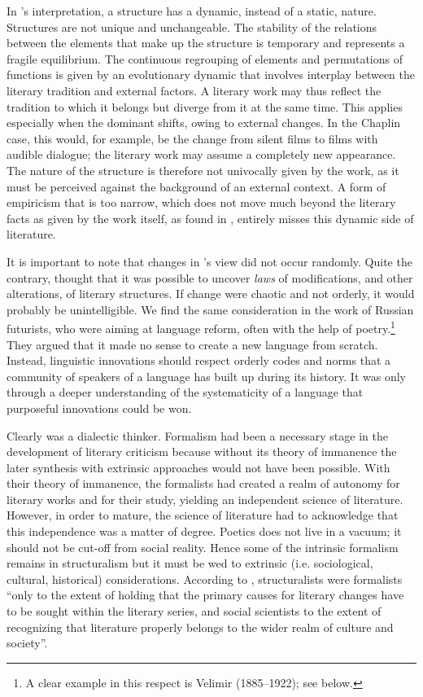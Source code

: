 \documentclass[output=paper]{langscibook}
\begin{document}
In {\Mukarovsky}'s interpretation, a structure has a dynamic, instead of a static, nature. Structures are not unique and unchangeable. The stability of the relations between the elements that make up the structure is temporary and represents a fragile equilibrium. The continuous regrouping of elements and permutations of functions is given by an evolutionary dynamic that involves interplay between the literary tradition and external factors. A literary work may thus reflect the tradition to which it belongs but diverge from it at the same time. This applies especially when the dominant shifts, owing to external changes. In the Chaplin case, this would, for example, be the change from silent films to films with audible dialogue; the literary work may assume a completely new appearance. The nature of the structure is therefore not univocally given by the work, as it must be perceived against the background of an external context. A form of empiricism that is too narrow, which does not move much beyond the literary facts as given by the work itself, as {\Mukarovsky} found in {\Shklovsky}, entirely misses this dynamic side of literature.

\largerpage[-1]
It is important to note that changes in {\Mukarovsky}'s view did not occur randomly. Quite the contrary, {\Mukarovsky} thought that it was possible to uncover \emph{laws} of modifications, and other alterations, of literary structures. If change were chaotic and not orderly, it would probably be unintelligible. We find the same consideration in the work of Russian futurists, who were aiming at language reform, often with the help of poetry.\footnote{A clear example in this respect is Velimir {\Khlebnikov} (1885--1922); see below.} They argued that it made no sense to create a new language from scratch. Instead, linguistic innovations should respect orderly codes and norms that a community of speakers of a language has built up during its history. It was only through a deeper understanding of the systematicity of a language that purposeful innovations could be won. 

Clearly {\Mukarovsky} was a dialectic thinker. Formalism had been a necessary stage in the development of literary criticism because without its theory of immanence the later synthesis with extrinsic approaches would not have been possible. With their theory of immanence, the formalists had created a realm of autonomy for literary works and for their study, yielding an independent science of literature. However, in order to mature, the science of literature had to acknowledge that this independence was a matter of degree. Poetics does not live in a vacuum; it should not be cut-off from social reality. Hence some of the intrinsic formalism remains in structuralism but it must be wed to extrinsic (i.e. sociological, cultural, historical) considerations. According to \citet[38]{Galan1985}, structuralists were formalists ``only to the extent of holding that the primary causes for literary changes have to be sought within the literary series, and social scientists to the extent of recognizing that literature properly belongs to the wider realm of culture and society''.
\end{document}
